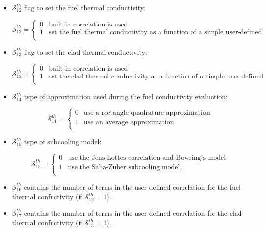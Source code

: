\begin{itemize}
\item $\mathcal{S}^{th}_{12}$ flag to set the fuel thermal conductivity:

\begin{displaymath} \mathcal{S}^{th}_{12} = \left\{
\begin{array}{rl}
 0 & \textrm{built-in correlation is used} \\
 1 & \textrm{set the fuel thermal conductivity as a function of a simple user-defined correlation.} \\
\end{array} \right.
\end{displaymath}

\item $\mathcal{S}^{th}_{13}$ flag to set the clad thermal conductivity:

\begin{displaymath} \mathcal{S}^{th}_{13} = \left\{
\begin{array}{rl}
 0 & \textrm{built-in correlation is used} \\
 1 & \textrm{set the clad thermal conductivity as a function of a simple user-defined correlation.} \\
\end{array} \right.
\end{displaymath}

\item $\mathcal{S}^{th}_{14}$ type of approximation used during the fuel conductivity evaluation:

\begin{displaymath} \mathcal{S}^{th}_{14} = \left\{
\begin{array}{rl}
 0 & \textrm{use a rectangle quadrature approximation} \\
 1 & \textrm{use an average approximation.} \\
\end{array} \right.
\end{displaymath}

\item $\mathcal{S}^{th}_{15}$ type of subcooling model:

\begin{displaymath} \mathcal{S}^{th}_{15} = \left\{
\begin{array}{rl}
 0 & \textrm{use the Jens-Lottes correlation and Bowring's model} \\
 1 & \textrm{use the Saha-Zuber subcooling model.} \\
\end{array} \right.
\end{displaymath}

\item $\mathcal{S}^{th}_{16}$ contains the number of terms in the user-defined correlation for the fuel thermal confuctivity (if $\mathcal{S}^{th}_{12}=1$).
\item $\mathcal{S}^{th}_{17}$ contains the number of terms in the user-defined correlation for the clad thermal confuctivity (if $\mathcal{S}^{th}_{13}=1$).
\end{itemize}

